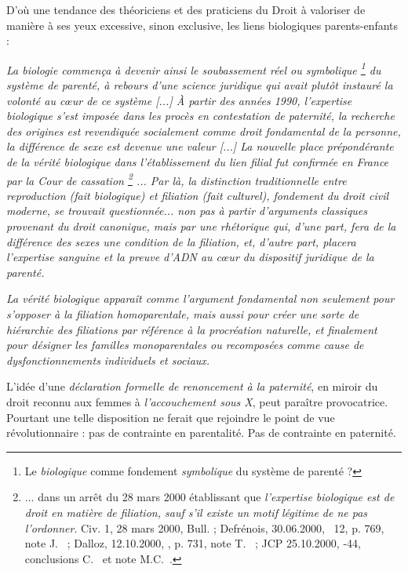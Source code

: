  D'où une tendance des théoriciens et des praticiens du Droit à valoriser de manière à ses yeux excessive, sinon exclusive, les liens biologiques parents-enfants :
%
\begin{displayquote}
{\emph{La biologie commença à devenir ainsi le soubassement réel ou symbolique%
\footnote{Le \emph{biologique} comme fondement \emph{symbolique} du système de parenté ?} 
du système de parenté, à rebours d'une science juridique qui avait plutôt instauré la volonté au cœur de ce système \emph{[...]} À partir des années 1990, l'expertise biologique s'est imposée dans les procès en contestation de paternité, la recherche des origines est revendiquée socialement comme droit fondamental de la personne, la différence de sexe est devenue une valeur \emph{[...]} La nouvelle place prépondérante de la vérité biologique dans l'établissement du lien filial fut confirmée en France par la Cour de cassation%
\footnote{... dans un arrêt du 28 mars 2000 établissant que {\emph{l'expertise biologique est de droit en matière de filiation, sauf s'il existe un motif légitime de ne pas l'ordonner}}. Civ. 1\iere, 28 mars 2000, Bull.  ; \hbox{Defrénois}, \hbox{30.06.2000}, \no~12, p. 769, note J.~ ; \hbox{Dalloz}, \hbox{12.10.2000}, , p. 731, note T.~ ; JCP \hbox{25.10.2000}, -44, conclusions C.~ et note M.C.~.}%
... Par là, la distinction traditionnelle entre reproduction (fait biologique) et filiation (fait culturel), fondement du droit civil moderne, se trouvait questionnée... non pas à partir d'arguments classiques provenant du droit canonique, mais par une rhétorique qui, d'une part, fera de la différence des sexes une condition  de la filiation, et, d'autre part, placera l'expertise sanguine et la preuve d'ADN au cœur du dispositif juridique de la parenté.}}
 
 {\emph{La vérité biologique apparaît comme l'argument fondamental non seulement pour s'opposer à la filiation homoparentale, mais aussi pour créer une sorte de hiérarchie des filiations par référence à la procréation naturelle, et finalement pour désigner les familles monoparentales ou recomposées comme cause de dysfonctionnements individuels et sociaux.}}
\end{displayquote} 
 
 L'idée d'une {\emph{déclaration formelle de renoncement à la paternité}}, en miroir du droit reconnu aux femmes à \emph{l'accouchement sous X}, peut paraître provocatrice. Pourtant une telle disposition ne ferait que rejoindre le point de vue révolutionnaire : pas de contrainte en parentalité. Pas de contrainte en paternité.
 
